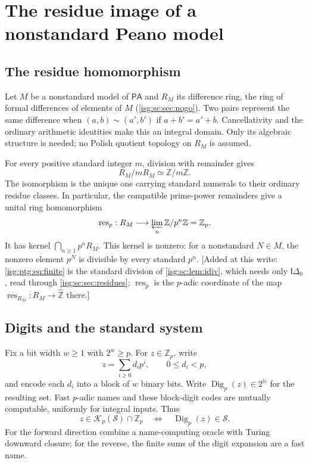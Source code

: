 \documentclass[11pt]{article}
\theoremstyle{definition}
\theoremstyle{remark}
\newcommand{\Z}{\mathbb{Z}}
\newcommand{\N}{\mathbb{N}}
\newcommand{\Zhat}{\widehat{\Z}}
\newcommand{\res}{\operatorname{res}}
\newcommand{\Idelta}{\mathsf{I}\Delta_0}
\newcommand{\Zp}{\mathbb{Z}_p}
\newcommand{\PA}{\mathsf{PA}}
\newcommand{\Dig}{\operatorname{Dig}}
\begin{document}
\section{The residue image of a nonstandard Peano model}\label{isg:ptg:sec:residues}

\subsection{The residue homomorphism}
Let $M$ be a nonstandard model of $\PA$ and $R_M$ its difference ring, the
ring of formal differences of elements of $M$ (\cref{isg:sc:sec:nogo}).
Two pairs represent the same difference when $(a,b)\sim(a',b')$ if
$a+b'=a'+b$. Cancellativity and the ordinary arithmetic identities make
this an integral domain. Only its algebraic structure is needed; no Polish
quotient topology on $R_M$ is assumed.

For every positive standard integer $m$, division with remainder gives
\begin{equation}\label{isg:ptg:eq:finite}
 R_M/mR_M\simeq\Z/m\Z.
\end{equation}
The isomorphism is the unique one carrying standard numerals to their
ordinary residue classes. In particular, the compatible prime-power
remainders give a unital ring homomorphism
\begin{equation}\label{isg:ptg:eq:res}
 \res_p:R_M\longrightarrow\varprojlim_n\Z/p^n\Z=\Zp.
\end{equation}
It has kernel $\bigcap_{n\geq1}p^nR_M$. This kernel is nonzero: for a
nonstandard $N\in M$, the nonzero element $p^N$ is divisible by every
standard $p^n$. \textup{[}Added at this write:
\eqref{isg:ptg:eq:finite} is the standard division of
\cref{isg:sc:lem:idiv}, which needs only $\Idelta$, read through
\cref{isg:sc:sec:residues}; $\res_p$ is the $p$-adic coordinate of the map
$\res_{R_M}:R_M\to\Zhat$ there.\textup{]}

\subsection{Digits and the standard system}
Fix a bit width $w\geq1$ with $2^w\geq p$. For $z\in\Zp$, write
\[
 z=\sum_{i\geq0}d_i p^i,\qquad 0\leq d_i<p,
\]
and encode each $d_i$ into a block of $w$ binary bits. Write
$\Dig_p(z)\in2^\N$ for the resulting set. Fast $p$-adic names and these
block-digit codes are mutually computable, uniformly for integral inputs.
Thus
\begin{equation}\label{isg:ptg:eq:digit}
 z\in\mathcal K_p(\mathcal S)\cap\Zp
 \quad\Longleftrightarrow\quad
 \Dig_p(z)\in\mathcal S.
\end{equation}
For the forward direction combine a name-computing oracle with Turing
downward closure; for the reverse, the finite sums of the digit expansion
are a fast name.
\end{document}
